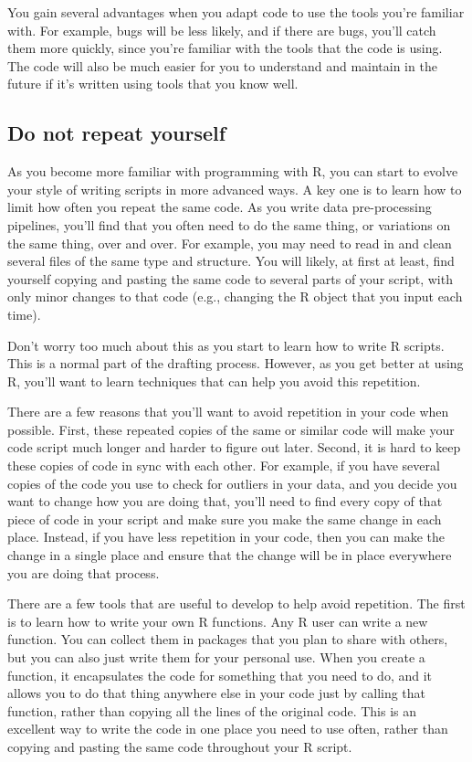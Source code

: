 \documentclass[]{tufte-book}
\begin{document}
You gain several advantages when you adapt code to use the tools you're familiar
with. For example, bugs will be less likely, and if there are bugs, you'll
catch them more quickly, since you're familiar with the tools that the code is
using. The code will also be much easier for you to understand and maintain in
the future if it's written using tools that you know well.

\subsection{Do not repeat yourself}\label{do-not-repeat-yourself}

As you become more familiar with programming with R, you can start to evolve your
style of writing scripts in more advanced ways. A key one is to learn how to limit
how often you repeat the same code. As you write data pre-processing pipelines, you'll
find that you often need to do the same thing, or variations on the same thing, over
and over. For example, you may need to read in and clean several files of the same
type and structure. You will likely, at first at least, find yourself copying and
pasting the same code to several parts of your script, with only minor changes to
that code (e.g., changing the R object that you input each time).

Don't worry too much about this as you start to learn how to write R scripts. This
is a normal part of the drafting process. However, as you get better at using R, you'll
want to learn techniques that can help you avoid this repetition.

There are a few reasons that you'll want to avoid repetition in your code when
possible. First, these repeated copies of the same or similar code will make
your code script much longer and harder to figure out later. Second, it is hard
to keep these copies of code in sync with each other. For example, if you have
several copies of the code you use to check for outliers in your data, and you
decide you want to change how you are doing that, you'll need to find every copy
of that piece of code in your script and make sure you make the same change in
each place. Instead, if you have less repetition in your code, then you can make
the change in a single place and ensure that the change will be in place
everywhere you are doing that process.

There are a few tools that are useful to develop to help avoid repetition. The
first is to learn how to write your own R functions. Any R user can write a new
function. You can collect them in packages that you plan to share with others, but
you can also just write them for your personal use. When you create a function, it
encapsulates the code for something that you need to do, and it allows you to do
that thing anywhere else in your code just by calling that function, rather
than copying all the lines of the original code. This is an excellent way to
write the code in one place you need to use often, rather than copying and
pasting the same code throughout your R script.
\end{document}
